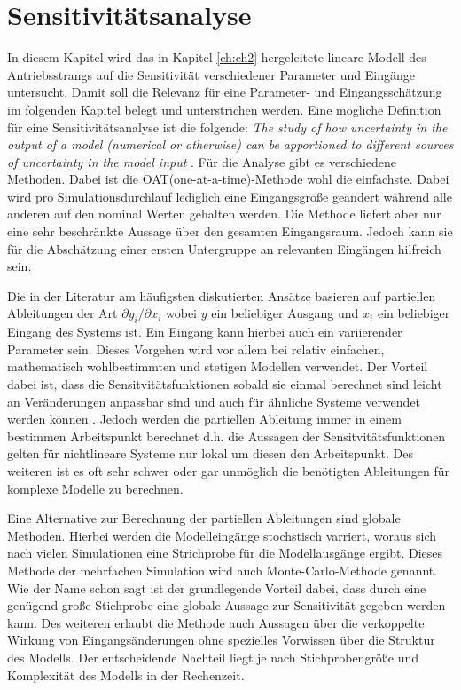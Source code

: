 \chapter{Sensitivitätsanalyse}\label{ch:Sensitivity}
In diesem Kapitel wird das in Kapitel \ref{ch:ch2} hergeleitete lineare Modell des Antriebsstrangs auf die Sensitivität verschiedener Parameter und Eingänge untersucht. Damit soll die Relevanz für eine Parameter- und Eingangsschätzung im folgenden Kapitel belegt und unterstrichen werden.
Eine mögliche Definition für eine Sensitivitätsanalyse ist die folgende: \emph{The study of how uncertainty in the output of a model (numerical or otherwise) can be apportioned to different sources of uncertainty in the model input} \cite{Saltelli.2004}.
Für die Analyse gibt es verschiedene Methoden. Dabei ist die OAT(one-at-a-time)-Methode wohl die einfachste. Dabei wird pro Simulationsdurchlauf lediglich eine Eingangsgröße geändert während alle anderen auf den nominal Werten gehalten werden. Die Methode liefert aber nur eine sehr beschränkte Aussage über den gesamten Eingangsraum. Jedoch kann sie für die Abschätzung einer ersten Untergruppe an relevanten Eingängen hilfreich sein.    

 Die in der Literatur am häufigsten diskutierten Ansätze basieren auf partiellen Ableitungen der Art $\partial y_i/\partial x_i$ wobei $y$ ein beliebiger Ausgang und $x_i$ ein beliebiger Eingang des Systems ist. Ein Eingang kann hierbei auch ein variierender Parameter sein. Dieses Vorgehen wird vor allem bei relativ einfachen, mathematisch wohlbestimmten und stetigen Modellen verwendet. Der Vorteil dabei ist, dass die Sensitvitätsfunktionen sobald sie einmal berechnet sind leicht an Veränderungen anpassbar sind und auch für ähnliche Systeme verwendet werden können \cite{Karnavas.1993}. Jedoch werden die partiellen Ableitung immer in einem bestimmen Arbeitspunkt berechnet d.h. die Aussagen der Sensitvitätsfunktionen gelten für nichtlineare Systeme nur lokal um diesen den Arbeitspunkt. Des weiteren ist es oft sehr schwer oder gar unmöglich die benötigten Ableitungen für komplexe Modelle zu berechnen.

Eine Alternative zur Berechnung der partiellen Ableitungen sind globale Methoden. Hierbei werden die Modelleingänge stochstisch varriert, woraus sich nach vielen Simulationen eine Strichprobe für die Modellausgänge ergibt. Dieses Methode der mehrfachen Simulation wird auch Monte-Carlo-Methode genannt. Wie der Name schon sagt ist der grundlegende Vorteil dabei, dass durch eine genügend große Stichprobe eine globale Aussage zur Sensitivität gegeben werden kann. Des weiteren erlaubt die Methode auch Aussagen über die verkoppelte Wirkung von Eingangsänderungen ohne spezielles Vorwissen über die Struktur des Modells. Der entscheidende Nachteil liegt je nach Stichprobengröße und Komplexität des Modells in der Rechenzeit.      

